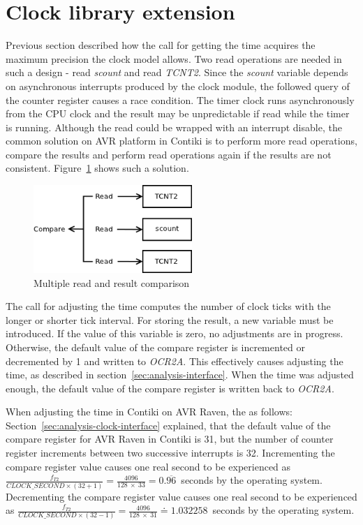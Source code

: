 
\section{Clock library extension}\label{sec:design-clock}
Previous section described how the call for getting the time acquires
the maximum precision the clock model allows.
Two read operations are needed in such a design - read {\it{scount}} and read {\it{TCNT2}}.
Since the {\it{scount}} variable depends on asynchronous interrupts produced by
the clock module, the followed query of the counter register causes a race condition.
The timer clock runs asynchronously from the CPU clock and
the result may be unpredictable if read while the timer is running.
Although the read could be wrapped with an interrupt disable,
the common solution on AVR platform in Contiki is to perform more read operations,
compare the results and perform read operations again if the results are not consistent.
Figure~\ref{fig:design-read} shows such a solution.

\begin{figure}
  \centering
  \includegraphics[width=6cm,keepaspectratio]{fig/read.png}
  \caption{Multiple read and result comparison}
  \label{fig:design-read}
\end{figure}

The call for adjusting the time computes the number of clock ticks
with the longer or shorter tick interval.
For storing the result, a new variable must be introduced.
If the value of this variable is zero, no adjustments are in progress.
Otherwise, the default value of the compare register is incremented or decremented by 1
and written to {\it{OCR2A}}.
This effectively causes adjusting the time, as described in section~\ref{sec:analysis-interface}.
When the time was adjusted enough,
the default value of the compare register is written back to {\it{OCR2A}}.

When adjusting the time in Contiki on AVR Raven, the as follows:
Section~\ref{sec:analysis-clock-interface} explained, that the default value
of the compare register for AVR Raven in Contiki is 31,
but the number of counter register increments between two successive interrupts is 32.
Incrementing the compare register value causes one real second to be experienced as
$\frac{f_{T2}}{CLOCK\_SECOND \times (32 + 1)} = \frac{4096}{128~\times~33} = 0.\overline{96}$~seconds
by the operating system.
Decrementing the compare register value causes one real second to be experienced as
$\frac{f_{T2}}{CLOCK\_SECOND \times (32 - 1)} = \frac{4096}{128~\times~31} \doteq 1.032258$~seconds
by the operating system.

